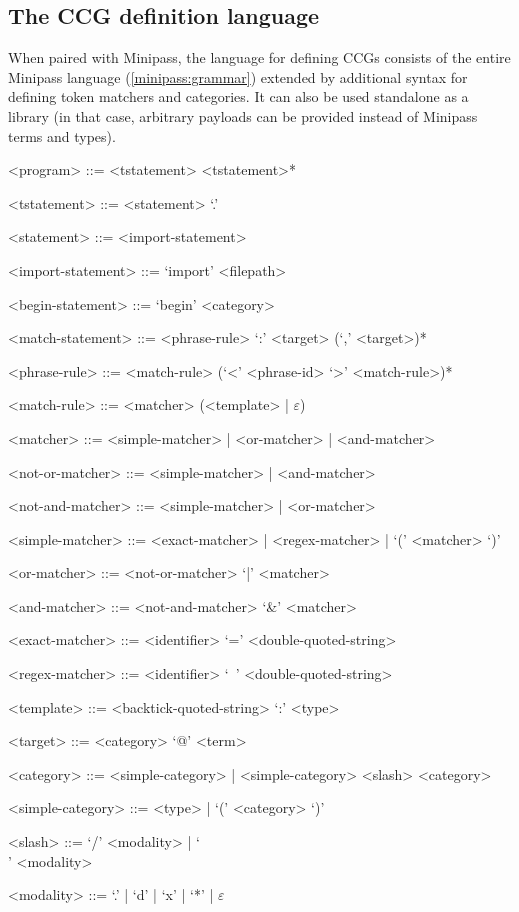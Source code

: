 \documentclass[main.tex]{subfiles}
\begin{document}
\pagebreak
\subsection{The CCG definition language}\label{sec:ccglang}
When paired with Minipass, the language for defining CCGs consists of
the entire Minipass language
(\cref{minipass:grammar}) extended by additional syntax for defining
token matchers and categories. It can also be used standalone as a library
(in that case, arbitrary payloads can be provided instead of Minipass
terms and types).

\begin{grammar}
    <program> ::= <tstatement> <tstatement>*

    <tstatement> ::= <statement> `.'

    <statement>  ::= <import-statement>

    <import-statement> ::= `import' <filepath>

    <begin-statement>  ::= `begin' <category>

    <match-statement>  ::= <phrase-rule> `:' <target> (`,' <target>)*

    <phrase-rule> ::= <match-rule> (`<' <phrase-id> `>' <match-rule>)*

    <match-rule> ::= <matcher> (<template> | $\varepsilon$)

    <matcher> ::= <simple-matcher> | <or-matcher> | <and-matcher>

    <not-or-matcher> ::= <simple-matcher> | <and-matcher>

    <not-and-matcher> ::= <simple-matcher> | <or-matcher>

    <simple-matcher> ::= <exact-matcher> | <regex-matcher> | `(' <matcher> `)'

    <or-matcher> ::= <not-or-matcher> `|' <matcher>

    <and-matcher> ::= <not-and-matcher> `\&' <matcher>

    <exact-matcher> ::= <identifier> `=' <double-quoted-string>

    <regex-matcher> ::= <identifier> `~' <double-quoted-string>

    <template> ::= <backtick-quoted-string> `:' <type>

    <target> ::= <category> `@' <term>

    <category> ::= <simple-category> | <simple-category> <slash> <category>

    <simple-category> ::= <type> | `(' <category> `)'

    <slash> ::= `/' <modality> | `\\' <modality>

    <modality> ::= `.' | `d' | `x' | `*' | $\varepsilon$
\end{grammar}
\end{document}
